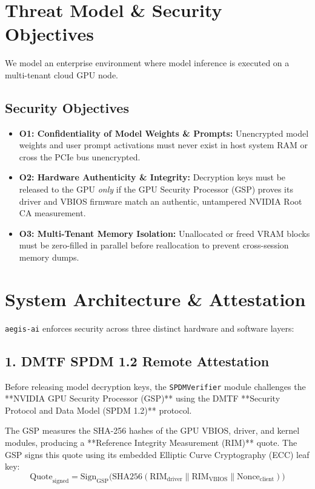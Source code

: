 \documentclass[11pt,a4paper]{article}
\begin{document}
\section{Threat Model \& Security Objectives}

We model an enterprise environment where model inference is executed on a multi-tenant cloud GPU node.

\subsection{Security Objectives}
\begin{itemize}
    \item \textbf{O1: Confidentiality of Model Weights \& Prompts:} Unencrypted model weights and user prompt activations must never exist in host system RAM or cross the PCIe bus unencrypted.
    \item \textbf{O2: Hardware Authenticity & Integrity:} Decryption keys must be released to the GPU \textit{only} if the GPU Security Processor (GSP) proves its driver and VBIOS firmware match an authentic, untampered NVIDIA Root CA measurement.
    \item \textbf{O3: Multi-Tenant Memory Isolation:} Unallocated or freed VRAM blocks must be zero-filled in parallel before reallocation to prevent cross-session memory dumps.
\end{itemize}

\section{System Architecture \& Attestation}

\texttt{aegis-ai} enforces security across three distinct hardware and software layers:

\subsection{1. DMTF SPDM 1.2 Remote Attestation}
Before releasing model decryption keys, the \texttt{SPDMVerifier} module challenges the **NVIDIA GPU Security Processor (GSP)** using the DMTF **Security Protocol and Data Model (SPDM 1.2)** protocol.

The GSP measures the SHA-256 hashes of the GPU VBIOS, driver, and kernel modules, producing a **Reference Integrity Measurement (RIM)** quote. The GSP signs this quote using its embedded Elliptic Curve Cryptography (ECC) leaf key:
\begin{equation}
\text{Quote}_{\text{signed}} = \text{Sign}_{\text{GSP}}\Big( \text{SHA256}(\text{RIM}_{\text{driver}} \parallel \text{RIM}_{\text{VBIOS}} \parallel \text{Nonce}_{\text{client}}) \Big)
\end{equation}
\end{document}
